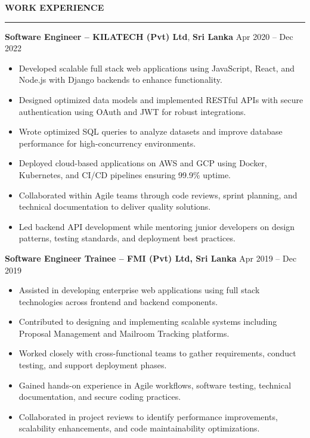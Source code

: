 \documentclass[10pt,letterpaper]{article}
\begin{document}
\vspace{8pt}

\textbf{WORK EXPERIENCE}\\[-8pt]
\noindent\rule{\textwidth}{1pt}

\vspace{-2pt}

\textbf{Software Engineer -- KILATECH (Pvt) Ltd}, \textbf{Sri Lanka} \hfill Apr 2020 -- Dec 2022

\vspace{-1pt}

\begin{itemize}
\item Developed scalable full stack web applications using JavaScript, React, and Node.js with Django backends to enhance functionality.
\item Designed optimized data models and implemented RESTful APIs with secure authentication using OAuth and JWT for robust integrations.
\item Wrote optimized SQL queries to analyze datasets and improve database performance for high-concurrency environments.
\item Deployed cloud-based applications on AWS and GCP using Docker, Kubernetes, and CI/CD pipelines ensuring 99.9\% uptime.
\item Collaborated within Agile teams through code reviews, sprint planning, and technical documentation to deliver quality solutions.
\item Led backend API development while mentoring junior developers on design patterns, testing standards, and deployment best practices.
\end{itemize}

\textbf{Software Engineer Trainee -- FMI (Pvt) Ltd, Sri Lanka} \hfill Apr 2019 -- Dec 2019

\vspace{-1pt}

\begin{itemize}
\item Assisted in developing enterprise web applications using full stack technologies across frontend and backend components.
\item Contributed to designing and implementing scalable systems including Proposal Management and Mailroom Tracking platforms.
\item Worked closely with cross-functional teams to gather requirements, conduct testing, and support deployment phases.
\item Gained hands-on experience in Agile workflows, software testing, technical documentation, and secure coding practices.
\item Collaborated in project reviews to identify performance improvements, scalability enhancements, and code maintainability optimizations.
\end{itemize}
\end{document}

